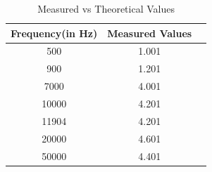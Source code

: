 \documentclass[a4paper,12pt]{article}
\begin{document}
\begin{table}[H]
\centering
\begin{tabular}{|c|c|c|}
\hline
\textbf{Frequency(in Hz)} & \textbf{Measured Values}  \\
\hline
500 & 1.001   \\
900 & 1.201    \\
7000 &   4.001   \\
10000 & 4.201   \\
11904 & 4.201  \\
20000 & 4.601   \\
50000 & 4.401  \\

\hline
\end{tabular}
\caption{Measured vs Theoretical Values}
\end{table}
\end{document}
